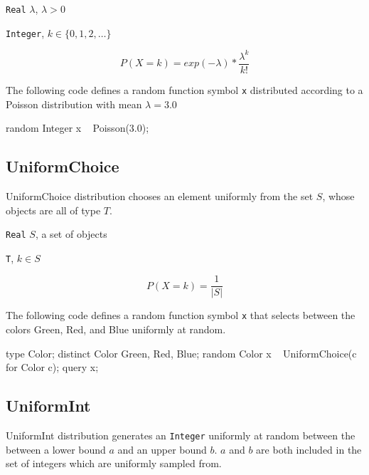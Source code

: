 \begin{itemize*}
\item[] \verb|Real| $\lambda$, $\lambda > 0$ 
\end{itemize*}

\begin{itemize*}
\item[] \verb|Integer|, $k \in \{0, 1, 2, \ldots \}$ 
\end{itemize*}

\[
	P(X = k) = exp(-\lambda) * \frac{\lambda^{k}}{k!}
\]

The following code defines a random function symbol \verb|x| distributed according to a Poisson distribution with mean $\lambda = 3.0$
\begin{blogcode}
random Integer x ~ Poisson(3.0);
\end{blogcode}


\subsection{UniformChoice}
\label{uniformchoice-appexdix}

UniformChoice distribution chooses an element uniformly from the set $S$, whose objects are all of type $T$.

\begin{itemize*}
\item[] \verb|Real| $S$, a set of objects 
\end{itemize*}

\begin{itemize*}
\item[] \verb|T|, $k \in S$ 
\end{itemize*}

\[
	P(X = k) = \frac{1}{|S|}
\]

The following code defines a random function symbol \verb|x| that selects between the colors Green, Red, and Blue uniformly at random.

\begin{blogcode}
type Color;
distinct Color Green, Red, Blue;
random Color x ~ UniformChoice({c for Color c});
query x;
\end{blogcode}

\subsection{UniformInt} \label{uniformint-section}
UniformInt distribution generates an \verb|Integer| uniformly at random between the between a lower bound $a$ and an upper bound $b$. $a$ and $b$ are both included in the set of integers which are uniformly sampled from.


